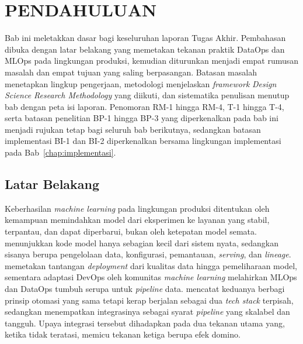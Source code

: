 \cleardoublepage
\chapter{PENDAHULUAN}
\label{chap:pendahuluan}

Bab ini meletakkan dasar bagi keseluruhan laporan Tugas Akhir. Pembahasan dibuka dengan latar belakang yang memetakan tekanan praktik DataOps dan MLOps pada lingkungan produksi, kemudian diturunkan menjadi empat rumusan masalah dan empat tujuan yang saling berpasangan. Batasan masalah menetapkan lingkup pengerjaan, metodologi menjelaskan \textit{framework} \textit{Design Science Research Methodology} yang diikuti, dan sistematika penulisan menutup bab dengan peta isi laporan. Penomoran RM-1 hingga RM-4, T-1 hingga T-4, serta batasan penelitian BP-1 hingga BP-3 yang diperkenalkan pada bab ini menjadi rujukan tetap bagi seluruh bab berikutnya, sedangkan batasan implementasi BI-1 dan BI-2 diperkenalkan bersama lingkungan implementasi pada Bab~\ref{chap:implementasi}.

\section{Latar Belakang}
\label{sec:latar-belakang}

Keberhasilan \textit{machine learning} pada lingkungan produksi ditentukan oleh kemampuan memindahkan model dari eksperimen ke layanan yang stabil, terpantau, dan dapat diperbarui, bukan oleh ketepatan model semata. \textcite{sculley2015hidden} menunjukkan kode model hanya sebagian kecil dari sistem nyata, sedangkan sisanya berupa pengelolaan data, konfigurasi, pemantauan, \textit{serving}, dan \textit{lineage}. \textcite{paleyes2022challenges} memetakan tantangan \textit{deployment} dari kualitas data hingga pemeliharaan model, sementara adaptasi DevOps oleh komunitas \textit{machine learning} melahirkan MLOps \autocite{kreuzberger2023mlops} dan DataOps tumbuh serupa untuk \textit{pipeline} data. \textcite{rella2022mlops} mencatat keduanya berbagi prinsip otomasi yang sama tetapi kerap berjalan sebagai dua \textit{tech stack} terpisah, sedangkan \textcite{jain2025integrating} menempatkan integrasinya sebagai syarat \textit{pipeline} yang skalabel dan tangguh. Upaya integrasi tersebut dihadapkan pada dua tekanan utama yang, ketika tidak teratasi, memicu tekanan ketiga berupa efek domino.

